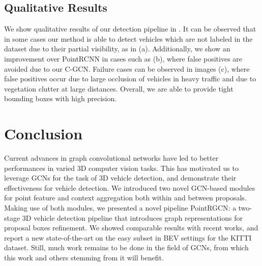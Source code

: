 \documentclass[10pt,twocolumn,letterpaper]{article}
\begin{document}
\subsection{Qualitative Results}
We show qualitative results of our detection pipeline in .
It can be observed that in some cases our method is able to detect vehicles which are not labeled in the dataset due to their partial visibility, as in (a).
Additionally, we show an improvement over PointRCNN in cases such as (b), where false positives are avoided due to our C-GCN.
Failure cases can be observed in images (c), where false positives occur due to large occlusion of vehicles in heavy traffic and due to vegetation clutter at large distances.
Overall, we are able to provide tight bounding boxes with high precision. 










































 \section{Conclusion}

Current advances in graph convolutional networks have led to better performances in varied 3D computer vision tasks.
This has motivated us to leverage GCNs for the task of 3D vehicle detection, and demonstrate their effectiveness for vehicle detection.
We introduced two novel GCN-based modules for point feature and context aggregation both within and between proposals.
Making use of both modules, we presented a novel pipeline PointRGCN: a two-stage 3D vehicle detection pipeline that introduces graph representations for proposal boxes refinement.
We showed comparable results with recent works, and report a new state-of-the-art on the easy subset in BEV settings for the KITTI dataset.
Still, much work remains to be done in the field of GCNs, from which this work and others stemming from it will benefit.
\end{document}
